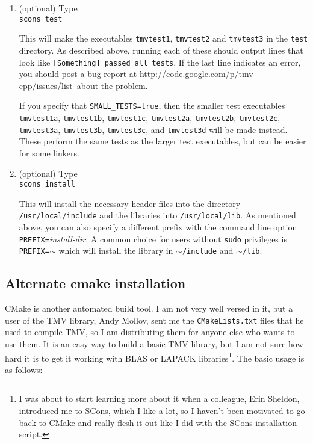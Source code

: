 \documentclass[twoside,letterpaper,11pt]{article}
\newcommand{\myissuesx}{http://code.google.com/p/tmv-cpp/issues/list}
\newcommand{\myissues}{\url{\myissuesx}}
\begin{document}
\begin{enumerate}
\item (optional) Type\\
\texttt{scons test}

This will make the executables \texttt{tmvtest1}, \texttt{tmvtest2} and \texttt{tmvtest3} in
the \texttt{test} directory.  As described above, running each of these should output 
lines that look like \texttt{[Something] passed all tests}.  If the last line indicates
an error, you should post a bug report at \myissues\ about the problem.

If you specify that \texttt{SMALL\_TESTS=true}, then the smaller test executables
\texttt{tmvtest1a}, \texttt{tmvtest1b}, \texttt{tmvtest1c}, \texttt{tmvtest2a}, \texttt{tmvtest2b}, \texttt{tmvtest2c},
\texttt{tmvtest3a}, \texttt{tmvtest3b}, \texttt{tmvtest3c}, and \texttt{tmvtest3d} will be made instead.
These perform the same tests as the larger test executables, but can be easier
for some linkers.

\item (optional) Type\\
\texttt{scons install}

This will install the necessary header files into the directory \texttt{/usr/local/include} and the libraries
into \texttt{/usr/local/lib}.  As mentioned above, you can also specify a different prefix 
with the command line option \texttt{PREFIX=}\emph{install-dir}.  A common choice for users
without \texttt{sudo} privileges is \texttt{PREFIX=$\sim$} which will install the library in \texttt{$\sim$/include}
and \texttt{$\sim$/lib}.

\end{enumerate}

\subsection{Alternate cmake installation}
\label{cmake}

CMake is another automated build tool.  I am not very well versed in it, but a user of the 
TMV library, Andy Molloy, sent me the \texttt{CMakeLists.txt} files that he used to compile TMV,
so I am distributing them for anyone else who wants
to use them.  It is an easy way to build a basic TMV library, but I am not sure how hard it is
to get it working with BLAS or LAPACK libraries\footnote{
I was about to start learning more about it when a colleague, Erin Sheldon, introduced me to
SCons, which I like a lot, so I haven't been motivated to go back to CMake and really flesh
it out like I did with the SCons installation script.}.
The basic usage is as follows:
\end{document}
